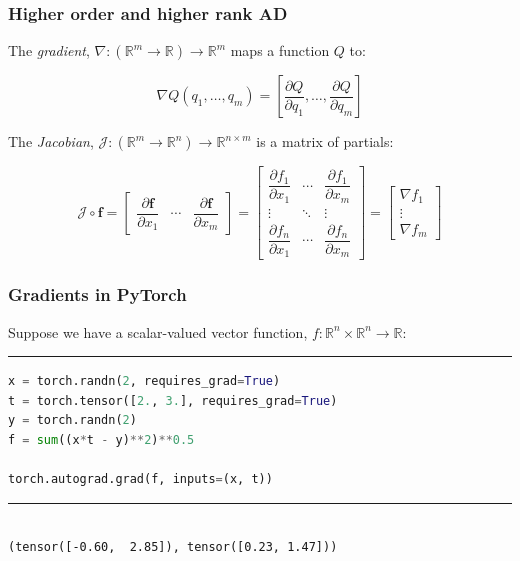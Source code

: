 \documentclass{beamer}
\begin{document}
    \begin{frame}
        \frametitle{Higher order and higher rank AD}

        The \textit{gradient}, $\nabla: (\mathbb{R}^m\rightarrow\mathbb{R})\rightarrow\mathbb{R}^m$ maps a function $Q$ to:

        \begin{equation*}
            \nabla Q(q_1, \dots, q_m) = \left[ \frac{\partial Q}{\partial q_1}, \dots, \frac{\partial Q}{\partial q_m}\right]
        \end{equation*}

        The \textit{Jacobian}, $\mathcal{J}: (\mathbb{R}^m\rightarrow\mathbb{R}^n)\rightarrow\mathbb{R}^{n \times m}$ is a matrix of partials:

        \begin{equation*}
            \mathcal{J}\circ\mathbf{f} =
            \begin{bmatrix}
                \dfrac{\partial \mathbf{f}}{\partial x_1} & \cdots & \dfrac{\partial \mathbf{f}}{\partial x_m}
            \end{bmatrix} =
            \begin{bmatrix}
                \dfrac{\partial f_1}{\partial x_1} & \cdots & \dfrac{\partial f_1}{\partial x_m}\\
                \vdots & \ddots & \vdots\\
                \dfrac{\partial f_n}{\partial x_1} & \cdots & \dfrac{\partial f_n}{\partial x_m}
            \end{bmatrix} =
            \begin{bmatrix}
                \nabla f_1 \\
                \vdots \\
                \nabla f_m
            \end{bmatrix}
        \end{equation*}
    \end{frame}

    \begin{frame}[fragile]
        \frametitle{Gradients in PyTorch}

        Suppose we have a scalar-valued vector function, $f: \mathbb{R}^{n}\times\mathbb{R}^{n}\rightarrow\mathbb{R}$:

        \noindent\rule{\textwidth}{0.5pt}

        \begin{lstlisting}[language=Python]
x = torch.randn(2, requires_grad=True)
t = torch.tensor([2., 3.], requires_grad=True)
y = torch.randn(2)
f = sum((x*t - y)**2)**0.5

torch.autograd.grad(f, inputs=(x, t))
        \end{lstlisting}

        \noindent\rule{\textwidth}{0.5pt}
        \begin{lstlisting}

(tensor([-0.60,  2.85]), tensor([0.23, 1.47]))
        \end{lstlisting}

    \end{frame}
\end{document}
